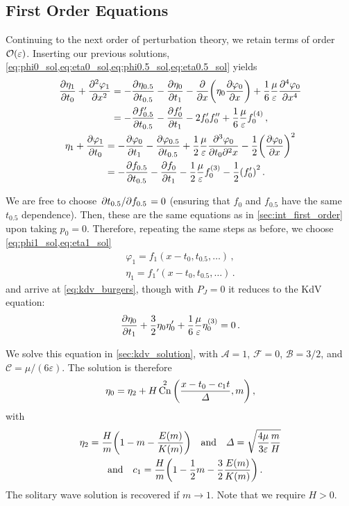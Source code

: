 \documentclass{jfm}
\let\Oldsubsection\subsection
\renewcommand{\subsection}{\FloatBarrier\Oldsubsection}
\DeclareMathOperator{\cn}{Cn}
\renewcommand*{\epsilon}{\varepsilon}
\begin{document}
\subsection{First Order Equations}
Continuing to the next order of perturbation theory, we retain terms of
order $\order{\epsilon}$.
Inserting our previous solutions,
\cref{eq:phi0_sol,eq:eta0_sol,eq:phi0.5_sol,eq:eta0.5_sol} yields
\begin{gather}
  \begin{aligned}
    \pdv{\eta_1}{t_0} + \pdv[2]{\varphi_{1}}{x} &=
      -\pdv{\eta_{0.5}}{t_{0.5}}
      -\pdv{\eta_0}{t_1} - \pdv{x} \pqty{\eta_0 \pdv{\varphi_0}{x}} +
      \frac{1}{6} \frac{\mu}{\epsilon} \pdv[4]{\varphi_0}{x} \\
    &= -\pdv{f_{0.5}'}{t_{0.5}} -\pdv{f_0'}{t_1} - 2 f_0' f_0'' +
      \frac{1}{6} \frac{\mu}{\epsilon} f_0^{(4)} \,,
  \end{aligned}
  \\
  \begin{aligned}
    \eta_1 + \pdv{\varphi_1}{t_0} &= -\pdv{\varphi_0}{t_1}
      - \pdv{\varphi_{0.5}}{t_{0.5}}
      + \frac{1}{2} \frac{\mu}{\epsilon} \frac{\partial^3 \varphi_0}
        {\partial t_0 \partial^2 x}
      - \frac{1}{2} \pqty{ \pdv{\varphi_0}{x} }^2 \\
      &= -\pdv{f_{0.5}}{t_{0.5}} -\pdv{f_0}{t_1} - \frac{1}{2}
        \frac{\mu}{\epsilon} f_0^{(3)} -
        \frac{1}{2} \pqty{f_0'}^2 \,.
  \end{aligned}
\end{gather}

We are free to choose $\pdv*{t_{0.5}}{f_{0.5}} = 0$ (ensuring that $f_0$
and $f_{0.5}$ have the same $t_{0.5}$ dependence).
Then, these are the same equations as in \cref{sec:int_first_order} upon
taking $p_0=0$.
Therefore, repeating the same steps as before, we choose
\cref{eq:phi1_sol,eq:eta1_sol}
\begin{align}
  \varphi_1 = f_1(x-t_0,t_{0.5},\ldots) \,, \\
  \eta_1 = f_1'(x-t_0,t_{0.5},\ldots) \,.
\end{align}
and arrive at \cref{eq:kdv_burgers}, though with $P_J =0$ it reduces to
the KdV equation:
\begin{equation}
  \pdv{\eta_0}{t_1} + \frac{3}{2} \eta_0 \eta_0' + \frac{1}{6}
    \frac{\mu}{\epsilon} \eta_0^{(3)} = 0 \,.
\end{equation}

We solve this equation in \cref{sec:kdv_solution}, with $\mathcal{A} =
1$, $\mathcal{F} = 0$, $\mathcal{B} = 3/2$, and $\mathcal{C} = \mu/(6
\epsilon)$.
The solution is therefore
\begin{equation}
  \eta_0 = \eta_2 + H \cn^2\pqty{\frac{x-t_0-c_1 t}{\Delta} , m} \,,
\end{equation}
with
\begin{gather}
  \eta_2 = \frac{H}{m} \pqty{1 - m - \frac{E(m)}{K(m)}}
  \qq{and}
  \Delta = \sqrt{\frac{4 \mu}{3 \epsilon} \frac{m}{H}}
  \\
  \qq{and}
  c_1 = \frac{H}{m} \pqty{1 - \frac{1}{2} m - \frac{3}{2}
    \frac{E(m)}{K(m)}} \,.
\end{gather}
The solitary wave solution is recovered if $m \to 1$.
Note that we require $H > 0$.
\end{document}
